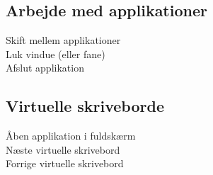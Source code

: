\documentclass[a4paper, landscape, 11pt]{scrartcl}
\newcommand{\command}[2]{#1~\dotfill{}~#2\\} %
\begin{document}
\begin{multicols}{2}
\subsection*{Arbejde med applikationer}
\command{Skift mellem applikationer}{\keys{\cmd + \tab}}
\command{Luk vindue (eller fane)}{}
\command{Afslut applikation}{}

\subsection*{Virtuelle skriveborde}
\command{Åben applikation i fuldskærm}{}
\command{Næste virtuelle skrivebord}{\keys{\ctrl + $\rightarrow$}}
\command{Forrige virtuelle skrivebord}{\keys{\ctrl + $\leftarrow$}}
\end{multicols}


\end{document}
